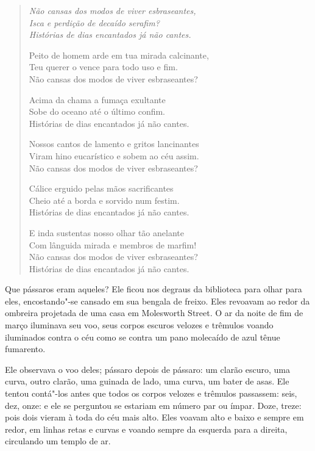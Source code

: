 \begin{verse}\itshape
Não cansas dos modos de viver esbraseantes,\\
Isca e perdição de decaído serafim?\\
Histórias de dias encantados já não cantes.

Peito de homem arde em tua mirada calcinante,\\
Teu querer o vence para todo uso e fim.\\
Não cansas dos modos de viver esbraseantes?

Acima da chama a fumaça exultante \\
Sobe do oceano até o último confim. \\
Histórias de dias encantados já não cantes.

Nossos cantos de lamento e gritos lancinantes\\
Viram hino eucarístico e sobem ao céu assim.\\
Não cansas dos modos de viver esbraseantes?

Cálice erguido pelas mãos sacrificantes\\
Cheio até a borda e sorvido num festim.\\
Histórias de dias encantados já não cantes.

E inda sustentas nosso olhar tão anelante\\
Com lânguida mirada e membros de marfim!\\
Não cansas dos modos de viver esbraseantes?\\
Histórias de dias encantados já não cantes.
\end{verse}

\asterisc

Que pássaros eram aqueles? Ele ficou nos degraus da biblioteca para
olhar para eles, encostando"-se cansado em sua bengala de freixo. Eles
revoavam ao redor da ombreira projetada de uma casa em Molesworth
Street. O ar da noite de fim de março iluminava seu voo, seus corpos
escuros velozes e trêmulos voando iluminados contra o céu como se
contra um pano molecaído de azul tênue fumarento.               

Ele observava o voo deles; pássaro depois de pássaro: um clarão escuro,
uma curva, outro clarão, uma guinada de lado, uma curva, um bater de
asas. Ele tentou contá"-los antes que todos os corpos velozes e trêmulos
passassem: seis, dez, onze: e ele se perguntou se estariam em número
par ou ímpar. Doze, treze: pois dois vieram à toda do céu mais alto.
Eles voavam alto e baixo e sempre em redor, em linhas retas e curvas e
voando sempre da esquerda para a direita, circulando um templo de ar.

